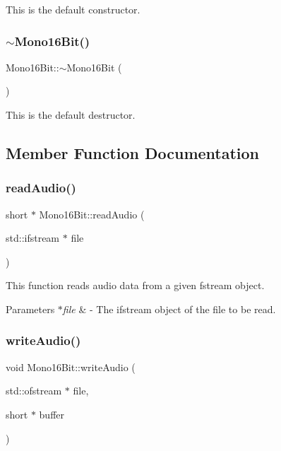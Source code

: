 This is the default constructor. \mbox{\label{classMono16Bit_a813c10ea813d3b06bd33602b4a24c8c6}} 
\subsubsection{\texorpdfstring{$\sim$\+Mono16\+Bit()}{~Mono16Bit()}}
{\footnotesize\ttfamily Mono16\+Bit\+::$\sim$\+Mono16\+Bit (\begin{DoxyParamCaption}{ }\end{DoxyParamCaption})}

This is the default destructor. 

\subsection{Member Function Documentation}
\mbox{\label{classMono16Bit_aaf15021eb1430170f892278aeac8ba10}} 
\subsubsection{\texorpdfstring{read\+Audio()}{readAudio()}}
{\footnotesize\ttfamily short $\ast$ Mono16\+Bit\+::read\+Audio (\begin{DoxyParamCaption}\item[{std\+::ifstream $\ast$}]{file }\end{DoxyParamCaption})}

This function reads audio data from a given fstream object. 
\begin{DoxyParams}{Parameters}
{\em $\ast$file} & -\/ The ifstream object of the file to be read. \\
\hline
\end{DoxyParams}
\mbox{\label{classMono16Bit_a3ef28645b53a11ca002344cf31d7c988}} 
\subsubsection{\texorpdfstring{write\+Audio()}{writeAudio()}}
{\footnotesize\ttfamily void Mono16\+Bit\+::write\+Audio (\begin{DoxyParamCaption}\item[{std\+::ofstream $\ast$}]{file,  }\item[{short $\ast$}]{buffer }\end{DoxyParamCaption})}

